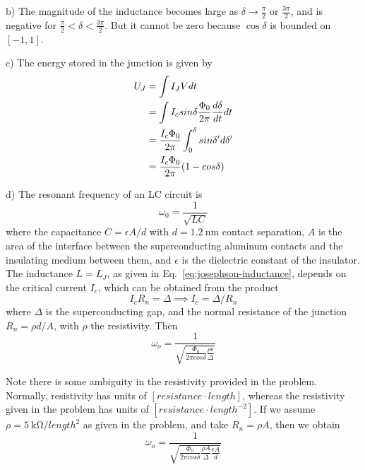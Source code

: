 \documentclass[12pt]{article}
\begin{document}
b) The magnitude of the inductance becomes large as $\delta \rightarrow \frac{\pi}{2}$ or $\frac{3\pi}{2}$, and is negative for $ \frac{\pi}{2}<\delta<\frac{3\pi}{2}$.
But it cannot be zero because $\cos\delta$ is bounded on $[-1, 1]$.

c) The energy stored in the junction is given by
\begin{alignat}{1}
    U_J \newline
    &= \int I_JVdt \\
    &=  \int I_csin\delta \frac{\Phi_0}{2\pi} \frac{d\delta}{dt} dt \\
    &= \frac{I_c \Phi_0}{2\pi} \int_0^\delta sin\delta' d\delta' \\
    &= \frac{I_c \Phi_0}{2\pi} (1-cos\delta)
\end{alignat}

d) The resonant frequency of an LC circuit is
\[\omega_0 = \frac{1}{\sqrt{LC}}\]
where the capacitance $C = \epsilon A/d$ with $d=\SI{1.2}{\nano\meter}$ contact separation, $A$ is the area of the interface between the superconducting aluminum contacts and the insulating medium between them, and $\epsilon$ is the dielectric constant of the insulator.
The inductance $L = L_J$, as given in Eq.~\eqref{eq:josephson-inductance}, depends on the critical current $I_c$, which can be obtained from the product
\[I_cR_n = \Delta \implies I_c = \Delta/R_n\]
where $\Delta$ is the superconducting gap, and the normal resistance of the junction $R_n = \rho d/A$, with $\rho$ the resistivity. Then
\begin{equation}
    \omega_o =\frac{1}{\sqrt{\frac{\Phi_0}{2\pi cos\delta} \frac{\rho\epsilon}{\Delta}}}
\end{equation}

Note there is some ambiguity in the resistivity provided in the problem. Normally, resistivity has units of $[\si{resistance{\cdot}length}]$, whereas the resistivity given in the problem has units of $[\si{resistance{\cdot}length^{-2}}]$. If we assume $\rho = \SI{5}{\kilo\ohm/length^2}$ as given in the problem, and take $R_n = \rho A$, then we obtain
\begin{equation}
    \omega_o =\frac{1}{\sqrt{\frac{\Phi_0}{2\pi cos\delta} \frac{\rho A}{\Delta} \frac{\epsilon A}{d} }}     
\end{equation}
\end{document}
